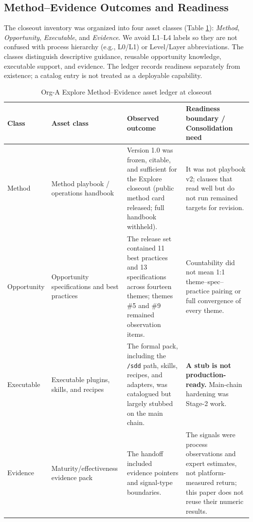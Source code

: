 \documentclass[10pt,conference]{IEEEtran}
\begin{document}
\subsection{Method--Evidence Outcomes and Readiness}

The closeout inventory was organized into four asset classes (Table
\ref{tab:asset-readiness}): \emph{Method}, \emph{Opportunity},
\emph{Executable}, and \emph{Evidence}.  We avoid L1--L4 labels so they
are not confused with process hierarchy (e.g., L0/L1) or Level/Layer
abbreviations.  The classes distinguish descriptive guidance,
reusable opportunity knowledge, executable support, and evidence.
The ledger records readiness separately from existence; a
catalog entry is not treated as a deployable capability.

\begin{table}[t]
\caption{Org-A Explore Method--Evidence asset ledger at closeout}
\label{tab:asset-readiness}
\centering
\footnotesize
\begin{tabularx}{\textwidth}{@{}p{}p{}X p{}@{}}
\toprule
\textbf{Class} & \textbf{Asset class} & \textbf{Observed outcome} &
\textbf{Readiness boundary / Consolidation need} \\
\midrule
Method & Method playbook / operations handbook &
Version 1.0 was frozen, citable, and sufficient for the Explore closeout
(public method card released; full handbook withheld). &
It was not playbook v2; clauses that read well but do not run remained
targets for revision. \\
\addlinespace
Opportunity & Opportunity specifications and best practices &
The release set contained 11 best practices and 13 specifications across
fourteen themes; themes \#5 and \#9 remained observation items. &
Countability did not mean 1:1 theme--spec--practice pairing or full
convergence of every theme. \\
\addlinespace
Executable & Executable plugins, skills, and recipes &
The formal pack, including the \texttt{/sdd} path, skills, recipes, and
adapters, was catalogued but largely stubbed on the main chain. &
\textbf{A stub is not production-ready.}  Main-chain hardening was Stage-2
work. \\
\addlinespace
Evidence & Maturity/effectiveness evidence pack &
The handoff included evidence pointers and signal-type boundaries. &
The signals were process observations and expert estimates, not
platform-measured return; this paper does not reuse their numeric results. \\
\bottomrule
\end{tabularx}
\end{table}
\end{document}
